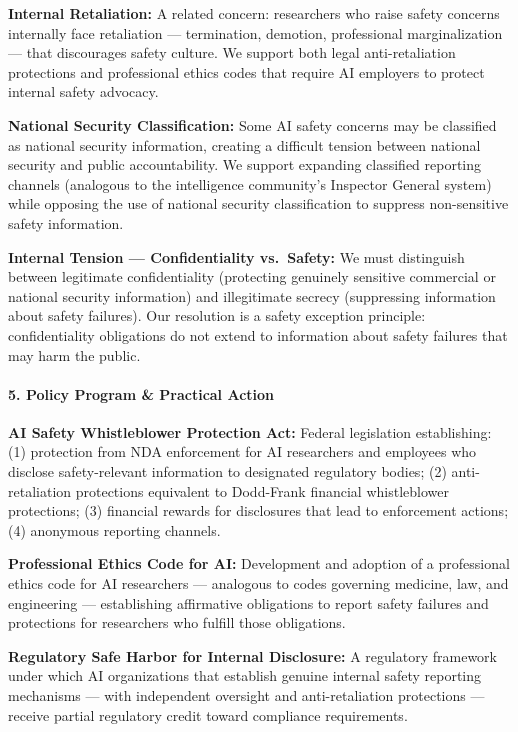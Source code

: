 \textbf{Internal Retaliation:} A related concern: researchers who raise
safety concerns internally face retaliation --- termination, demotion,
professional marginalization --- that discourages safety culture. We
support both legal anti-retaliation protections and professional ethics
codes that require AI employers to protect internal safety advocacy.

\textbf{National Security Classification:} Some AI safety concerns may
be classified as national security information, creating a difficult
tension between national security and public accountability. We support
expanding classified reporting channels (analogous to the intelligence
community's Inspector General system) while opposing the use of national
security classification to suppress non-sensitive safety information.

\textbf{Internal Tension --- Confidentiality vs.~Safety:} We must
distinguish between legitimate confidentiality (protecting genuinely
sensitive commercial or national security information) and illegitimate
secrecy (suppressing information about safety failures). Our resolution
is a safety exception principle: confidentiality obligations do not
extend to information about safety failures that may harm the public.

\paragraph{5. Policy Program \& Practical
Action}\label{policy-program-practical-action-7}

\textbf{AI Safety Whistleblower Protection Act:} Federal legislation
establishing: (1) protection from NDA enforcement for AI researchers and
employees who disclose safety-relevant information to designated
regulatory bodies; (2) anti-retaliation protections equivalent to
Dodd-Frank financial whistleblower protections; (3) financial rewards
for disclosures that lead to enforcement actions; (4) anonymous
reporting channels.

\textbf{Professional Ethics Code for AI:} Development and adoption of a
professional ethics code for AI researchers --- analogous to codes
governing medicine, law, and engineering --- establishing affirmative
obligations to report safety failures and protections for researchers
who fulfill those obligations.

\textbf{Regulatory Safe Harbor for Internal Disclosure:} A regulatory
framework under which AI organizations that establish genuine internal
safety reporting mechanisms --- with independent oversight and
anti-retaliation protections --- receive partial regulatory credit
toward compliance requirements.


